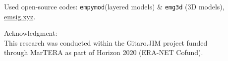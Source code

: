 \documentclass[xcolor=svgnames, usepdftitle=false, aspectratio=169]{beamer}
\newcommand{\emg}[2]{\texttt{emg#1#2}\xspace}
\newcommand{\empymod}{\texttt{empymod}\xspace}
\begin{document}
\begin{frame}
Used open-source codes: \empymod (layered models) \& \emg3d (3D models),
\href{https://emsig.xyz}{emsig.xyz}.

Acknowledgment:\\
\scriptsize
This research was conducted within the Gitaro.JIM project funded\\
through MarTERA as part of Horizon 2020 (ERA-NET Cofund).



\end{frame}
\end{document}
